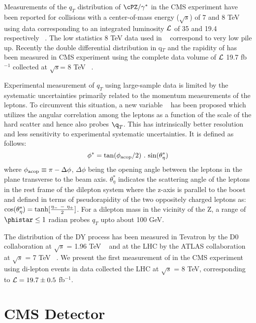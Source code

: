 Measurements of the $q_T$ distribution of $\cPZ/\gamma^{*}$ in the CMS experiment have been reported for collisions with a center-of-mass energy ($\sqrt{s}$) of 7 and 8 TeV using data corresponding to an integrated luminosity ${\cal L}$ of 35 \pbinv and 19.4 \pbinv respectively ~\cite{Aad:2011gj,Chatrchyan:2011wt,CMS-PAS-SMP-12-025}. The low statistics 8 TeV data used in ~\cite{CMS-PAS-SMP-12-025} correspond to very low pile up. Recently the double differential distribution in q$_{T}$ and the rapidity of \cPZ has been measured in CMS experiment using the complete data volume of ${\cal L}$ 19.7 fb$^{-1}$ collected at $\sqrt{s}$= 8 TeV ~\cite{CMS-PAS-SMP-13-013}. 

Experimental measurement of $q_T$ using large-sample data is limited by the systematic uncertainties primarily related to the momentum measurements of the leptons. To circumvent this situation, a new variable \phistar ~\cite{Banfi:2012du} has been proposed which utilizes the angular correlation among the leptons as a function of the scale of the hard scatter and hence also probes $\q_T$. This has intrinsically better resolution and less sensitivity to experimental systematic uncertainties. It is defined as follows:
$$\phi^*  = {\rm tan} (\phi _{\rm acop} /2) ~.~{\rm sin}(\theta ^* _\eta)$$
where $\phi_{\rm acop} \equiv \pi -\Delta\phi$,  $\Delta\phi$ being the opening angle between the leptons in the plane transverse to the beam axis. $\theta^{*}_\eta$ indicates the scattering angle of the leptons in the rest frame of the dilepton system where the z-axis is parallel to the boost  and defined in terms of pseudorapidity of the two oppositely charged leptons as:
${\rm cos}(\theta ^* _\eta)= {\rm tanh} [\frac{\eta _- ~-~\eta _+}{2}]$.
For a dilepton mass in the vicinity of the Z, a range of $\phistar \le 1$ radian probes $q_T$ upto about 100 GeV. 

 The \phistar distribution of the DY process has been measured in Tevatron by the D0 collaboration at $\sqrt{s}$ = 1.96 TeV ~\cite{Abazov:2010mk}  and at the LHC by the ATLAS collaboration at $\sqrt{s}$ = 7 TeV ~\cite{Aad:2012wfa}. We present the first measurement of \phistar in the CMS experiment using di-lepton events in data collected the LHC at $\sqrt{s}$ = 8 TeV, corresponding to ${\cal L} = 19.7  \pm 0.5$ fb$^{-1}$. 


\section{CMS Detector}
\label{sec:detector}

